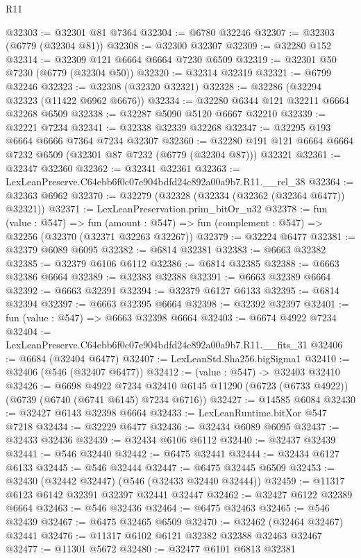 \begin{lexlean}{R11}
\begin{coremodule}
@32303 := @32301 @81 @7364
@32304 := @6780 @32246
@32307 := @32303 (@6779 (@32304 @81))
@32308 := @32300 @32307
@32309 := @32280 @152
@32314 := @32309 @121 @6664 @6664 @7230 @6509
@32319 := @32301 @50 @7230 (@6779 (@32304 @50))
@32320 := @32314 @32319
@32321 := @6799 @32246
@32323 := @32308 (@32320 @32321)
@32328 := @32286 (@32294 @32323 (@11422 @6962 @6676))
@32334 := @32280 @6344 @121 @32211 @6664 @32268 @6509
@32338 := @32287 @5090 @5120 @6667 @32210
@32339 := @32221 @7234
@32341 := @32338 @32339 @32268
@32347 := @32295 @193 @6664 @6666 @7364 @7234 @32307
@32360 := @32280 @191 @121 @6664 @6664 @7232 @6509 (@32301 @87 @7232 (@6779 (@32304 @87))) @32321
@32361 := @32347 @32360
@32362 := @32341 @32361
@32363 := LexLeanPreserve.C64ebb6f0c07e904bdfd24c892a00a9b7.R11.__rel_38
@32364 := @32363 @6962
@32370 := @32279 (@32328 (@32334 (@32362 (@32364 @6477)) @32321))
@32371 := LexLeanPreservation.prim_bitOr_u32
@32378 := fun (value : @547) =>
  fun (amount : @547) => fun (complement : @547) => @32256 (@32370 (@32371 @32263 @32267))
@32379 := @32224 @6477
@32381 := @32379 @6089 @6095
@32382 := @6814 @32381
@32383 := @6663 @32382
@32385 := @32379 @6106 @6112
@32386 := @6814 @32385
@32388 := @6663 @32386 @6664
@32389 := @32383 @32388
@32391 := @6663 @32389 @6664
@32392 := @6663 @32391
@32394 := @32379 @6127 @6133
@32395 := @6814 @32394
@32397 := @6663 @32395 @6664
@32398 := @32392 @32397
@32401 := fun (value : @547) => @6663 @32398 @6664
@32403 := @6674 @4922 @7234
@32404 := LexLeanPreserve.C64ebb6f0c07e904bdfd24c892a00a9b7.R11.__fits_31
@32406 := @6684 (@32404 @6477)
@32407 := LexLeanStd.Sha256.bigSigma1
@32410 := @32406 (@546 (@32407 @6477))
@32412 := (value : @547) -> @32403 @32410
@32426 := @6698
    @4922
    @7234
    @32410
    @6145
    @11290
    (@6723 (@6733 @4922))
    (@6739 (@6740 (@6741 @6145) @7234 @6716))
@32427 := @14585 @6084
@32430 := @32427 @6143 @32398 @6664
@32433 := LexLeanRuntime.bitXor @547 @7218
@32434 := @32229 @6477
@32436 := @32434 @6089 @6095
@32437 := @32433 @32436
@32439 := @32434 @6106 @6112
@32440 := @32437 @32439
@32441 := @546 @32440
@32442 := @6475 @32441
@32444 := @32434 @6127 @6133
@32445 := @546 @32444
@32447 := @6475 @32445 @6509
@32453 := @32430 (@32442 @32447) (@546 (@32433 @32440 @32444))
@32459 := @11317 @6123 @6142 @32391 @32397 @32441 @32447
@32462 := @32427 @6122 @32389 @6664
@32463 := @546 @32436
@32464 := @6475 @32463
@32465 := @546 @32439
@32467 := @6475 @32465 @6509
@32470 := @32462 (@32464 @32467) @32441
@32476 := @11317 @6102 @6121 @32382 @32388 @32463 @32467
@32477 := @11301 @5672
@32480 := @32477 @6101 @6813 @32381

\end{coremodule}
\end{lexlean}
